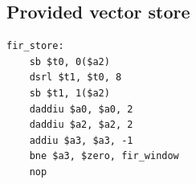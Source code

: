 \subsection{Provided vector store}
\begin{verbatim}
fir_store:
    sb $t0, 0($a2)
    dsrl $t1, $t0, 8
    sb $t1, 1($a2)
    daddiu $a0, $a0, 2
    daddiu $a2, $a2, 2
    addiu $a3, $a3, -1
    bne $a3, $zero, fir_window
    nop
\end{verbatim}
